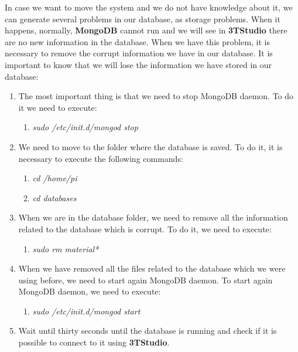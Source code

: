 In case we want to move the system and we do not have knowledge about it, we can generate several problems in our database, as storage problems. When it happens, normally, \textbf{MongoDB} cannot run and we will see in \textbf{3TStudio} there are no new information in the database. When we have this problem, it is necessary to remove the corrupt information we have in our database. It is important to know that we will lose the information we have stored in our database:

\begin{enumerate}

\item The most important thing is that we need to stop MongoDB daemon. To do it we need to execute:

\begin{enumerate}

\item \textit{sudo /etc/init.d/mongod stop}

\end{enumerate}

\item We need to move to the folder where the database is saved. To do it, it is necessary to execute the following commands:

\begin{enumerate}

\item \textit{cd /home/pi}
\item \textit{cd databases}

\end{enumerate}

\item When we are in the database folder, we need to remove all the information related to the database which is corrupt. To do it, we need to execute:

\begin{enumerate}

\item \textit{sudo rm material*}

\end{enumerate}

\item When we have removed all the files related to the database which we were using before, we need to start again MongoDB daemon. To start again MongoDB daemon, we need to execute:

\begin{enumerate}

\item \textit{sudo /etc/init.d/mongod start}

\end{enumerate}

\item Wait until thirty seconds until the database is running and check if it is possible to connect to it using \textbf{3TStudio}.

\end{enumerate}

